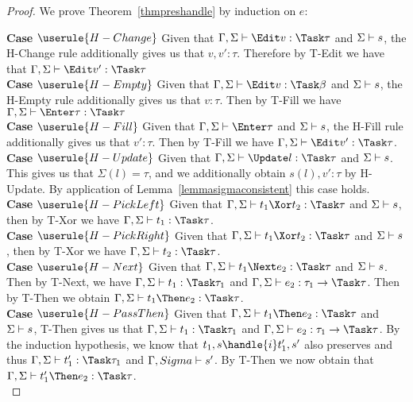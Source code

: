 \begin{proof}
  We prove Theorem~\ref{thmpreshandle} by induction on $e$:

  \noindent\textbf{Case} $\userule{H-Change}$ Given that $\Gamma,\Sigma\infers\Edit v:\Task\tau$ and $\Sigma\vdash s$, the H-Change rule additionally gives us that $v,v':\tau$. Therefore by T-Edit we have that $\Gamma,\Sigma\infers\Edit v':\Task\tau$\\

  \noindent\textbf{Case} $\userule{H-Empty}$ Given that $\Gamma,\Sigma\infers\Edit v:\Task\beta$ and $\Sigma\vdash s$, the H-Empty rule additionally gives us that $v:\tau$. Then by T-Fill we have $\Gamma,\Sigma\infers\Enter \tau:\Task\tau$ \\

  \noindent\textbf{Case} $\userule{H-Fill}$ Given that $\Gamma,\Sigma\infers\Enter\tau$ and $\Sigma\vdash s$, the H-Fill rule additionally gives us that $v':\tau$. Then by T-Fill we have $\Gamma,\Sigma\infers \Edit v':\Task\tau$.\\

  \noindent\textbf{Case} $\userule{H-Update}$ Given that $\Gamma,\Sigma\infers\Update l:\Task\tau$ and $\Sigma\vdash s$. This gives us that $\Sigma(l)=\tau$, and we additionally obtain $s(l),v':\tau$ by H-Update. By application of Lemma~\ref{lemmasigmaconsistent} this case holds.\\

  \noindent\textbf{Case} $\userule{H-PickLeft}$ Given that $\Gamma,\Sigma\infers t_1\Xor t_2:\Task\tau$ and $\Sigma\vdash s$, then by T-Xor we have $\Gamma,\Sigma\infers t_1:\Task \tau$.\\

  \noindent\textbf{Case} $\userule{H-PickRight}$ Given that $\Gamma,\Sigma\infers t_1\Xor t_2:\Task\tau$ and $\Sigma\vdash s$, then by T-Xor we have $\Gamma,\Sigma\infers t_2:\Task \tau$. \\

  \noindent\textbf{Case} $\userule{H-Next}$ Given that $\Gamma,\Sigma\infers t_1\Next e_2 :\Task\tau$ and $\Sigma\vdash s$. Then by T-Next, we have $\Gamma,\Sigma\infers t_1:\Task\tau_1$ and $\Gamma,\Sigma\infers e_2:\tau_1\to\Task\tau$. Then by T-Then we obtain $\Gamma,\Sigma\infers t_1\Then e_2:\Task\tau$.\\

  \noindent\textbf{Case} $\userule{H-PassThen}$ Given that $\Gamma,\Sigma\infers t_1\Then e_2:\Task\tau$ and $\Sigma\vdash s$, T-Then gives us that $\Gamma,\Sigma\infers t_1:\Task\tau_1$ and $\Gamma,\Sigma\infers e_2:\tau_1\to\Task\tau$. By the induction hypothesis, we know that $t_1,s\handle{i}t_1',s'$ also preserves and thus $\Gamma,\Sigma\infers t_1':\Task\tau_1$ and $\Gamma,Sigma\vdash s'$. By T-Then we now obtain that $\Gamma,\Sigma\infers t_1'\Then e_2:\Task\tau$. \\


\end{proof}
